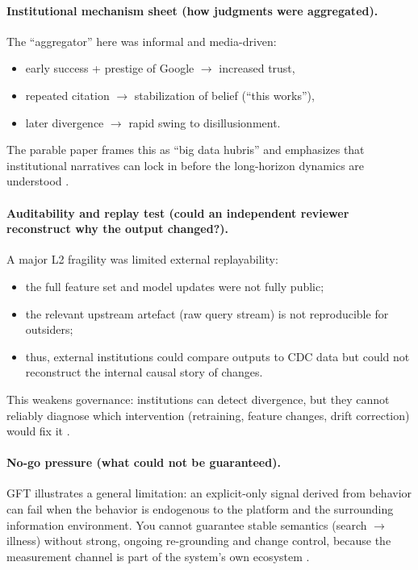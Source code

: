 \paragraph{Institutional mechanism sheet (how judgments were aggregated).}
The “aggregator” here was informal and media-driven:
\begin{itemize}
  \item early success + prestige of Google $\rightarrow$ increased trust,
  \item repeated citation $\rightarrow$ stabilization of belief (“this works”),
  \item later divergence $\rightarrow$ rapid swing to disillusionment.
\end{itemize}
The parable paper frames this as “big data hubris” and emphasizes that institutional narratives can lock in before the long-horizon dynamics are understood \cite{Lazer2014Science,Butler2013Nature}.

\paragraph{Auditability and replay test (could an independent reviewer reconstruct why the output changed?).}
A major L2 fragility was limited external replayability:
\begin{itemize}
  \item the full feature set and model updates were not fully public;
  \item the relevant upstream artefact (raw query stream) is not reproducible for outsiders;
  \item thus, external institutions could compare outputs to CDC data but could not reconstruct the internal causal story of changes.
\end{itemize}
This weakens governance: institutions can detect divergence, but they cannot reliably diagnose which intervention (retraining, feature changes, drift correction) would fix it \cite{Lazer2014Science}.

\paragraph{No-go pressure (what could not be guaranteed).}
GFT illustrates a general limitation: an explicit-only signal derived from behavior can fail when the behavior is endogenous to the platform and the surrounding information environment. You cannot guarantee stable semantics (search $\rightarrow$ illness) without strong, ongoing re-grounding and change control, because the measurement channel is part of the system’s own ecosystem \cite{Lazer2014Science}.

